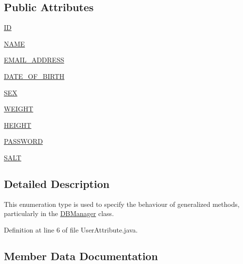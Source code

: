 \subsection*{Public Attributes}
\begin{DoxyCompactItemize}
\item 
\hyperlink{enumcom_1_1activitytracker_1_1_user_attribute_a82c5680d15b629e939afcd98a39abf76}{ID}
\item 
\hyperlink{enumcom_1_1activitytracker_1_1_user_attribute_aac51a5dfcaaa9e5304d37d74fc888af4}{N\+A\+ME}
\item 
\hyperlink{enumcom_1_1activitytracker_1_1_user_attribute_a8b9fa2ebf911262dfa24c683ff2a3b9c}{E\+M\+A\+I\+L\+\_\+\+A\+D\+D\+R\+E\+SS}
\item 
\hyperlink{enumcom_1_1activitytracker_1_1_user_attribute_af3b77ceae76c5f1c46e6821dc98940ee}{D\+A\+T\+E\+\_\+\+O\+F\+\_\+\+B\+I\+R\+TH}
\item 
\hyperlink{enumcom_1_1activitytracker_1_1_user_attribute_a53fe928fb805b69c606a351aac257558}{S\+EX}
\item 
\hyperlink{enumcom_1_1activitytracker_1_1_user_attribute_a024206b0dc3261031ef586b3f0fd530c}{W\+E\+I\+G\+HT}
\item 
\hyperlink{enumcom_1_1activitytracker_1_1_user_attribute_a0a80ca5cce8eb4494c2128bd4291a5b7}{H\+E\+I\+G\+HT}
\item 
\hyperlink{enumcom_1_1activitytracker_1_1_user_attribute_aa893eac0362a28e73a599ce1ba141d40}{P\+A\+S\+S\+W\+O\+RD}
\item 
\hyperlink{enumcom_1_1activitytracker_1_1_user_attribute_acd286be9d131a84a2be02e1cdac4c848}{S\+A\+LT}
\end{DoxyCompactItemize}


\subsection{Detailed Description}
This enumeration type is used to specify the behaviour of generalized methods, particularly in the \hyperlink{classcom_1_1activitytracker_1_1_d_b_manager}{D\+B\+Manager} class. 

Definition at line 6 of file User\+Attribute.\+java.



\subsection{Member Data Documentation}
